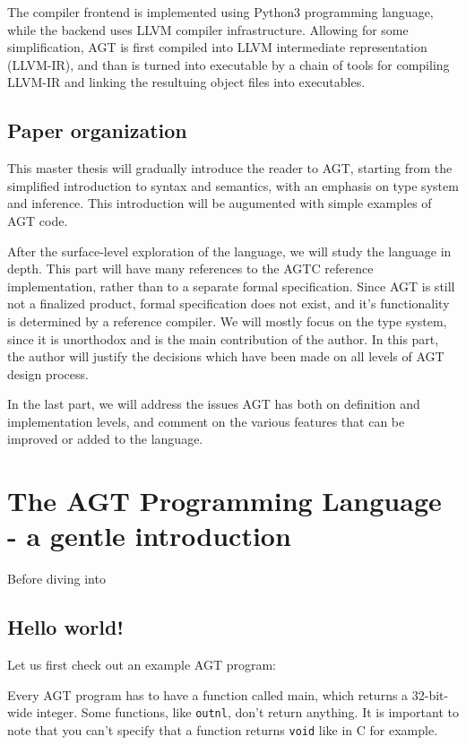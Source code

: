\documentclass[times, utf8, diplomski]{fer}
\theoremstyle{definition}
\begin{document}
The compiler frontend is implemented using Python3 programming language,
while the backend uses LLVM \citep{c_llvm_lattner} compiler infrastructure.
Allowing for some simplification, AGT is first compiled into LLVM intermediate representation (LLVM-IR),
and than is turned into executable by a chain of tools for compiling LLVM-IR and 
linking the resultuing object files into executables.

\section{Paper organization}

This master thesis will gradually introduce the reader to AGT, starting from the simplified introduction
to syntax and semantics, with an emphasis on type system and inference. This introduction will be
augumented with simple examples of AGT code. 

After the surface-level exploration of the language, we will study the language in depth. 
This part will have many references to the AGTC reference implementation, 
rather than to a separate formal specification. Since AGT is still not a finalized product,
formal specification does not exist, and it's functionality is determined by a reference compiler.
We will mostly focus on the type system, since it is unorthodox and is the main contribution of the author.
In this part, the author will justify the decisions which have been made on all levels of AGT design process.

In the last part, we will address the issues AGT has both on definition and implementation levels,
and comment on the various features that can be improved or added to the language.

\chapter{The AGT Programming Language - a gentle introduction}

Before diving into

\section{Hello world!}

Let us first check out an example AGT program:



Every AGT program has to have a function called main, which returns a 32-bit-wide integer.
Some functions, like \texttt{outnl}, don't return anything. It is important to note that you can't
specify that a function returns \texttt{void} like in C for example.
\end{document}
